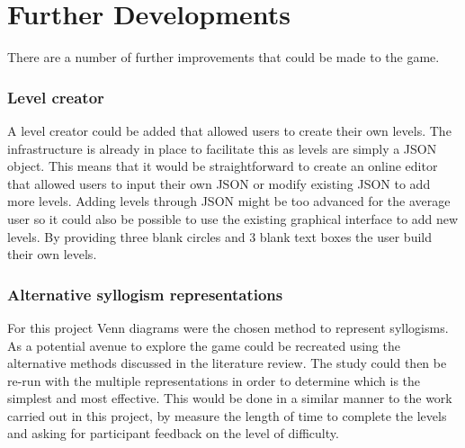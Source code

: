 \documentclass[12pt,a4paper]{report}
\begin{document}
\section{Further Developments}
There are a number of further improvements that could be made to the game.


\subsubsection{Level creator}
A level creator could be added that allowed users to create their own levels. The infrastructure is already in place to facilitate this as levels are simply a JSON object. This means that it would be straightforward to create an online editor that allowed users to input their own JSON or modify existing JSON to add more levels. Adding levels through JSON might be too advanced for the average user so it could also be possible to use the existing graphical interface to add new levels. By providing three blank circles and 3 blank text boxes the user build their own levels. 


\subsubsection{Alternative syllogism representations}
For this project Venn diagrams were the chosen method to represent syllogisms. As a potential avenue to explore the game could be recreated using the alternative methods discussed in the literature review. The study could then be re-run with the multiple representations in order to determine which is the simplest and most effective. This would be done in a similar manner to the work carried out in this project, by measure the length of time to complete the levels and asking for participant feedback on the level of difficulty.




 
\end{document}
